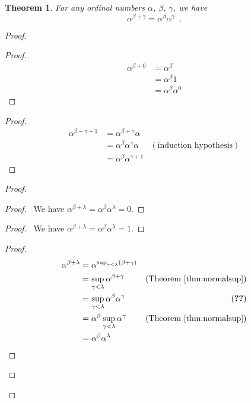 \documentclass{book}
\let\qed\relax
\newtheorem{thm}[ax]{Theorem}
\theoremstyle{definition}
\begin{document}
\begin{thm}
For any ordinal numbers $\alpha$, $\beta$, $\gamma$, we have
\[ \alpha^{\beta + \gamma} = \alpha^\beta \alpha^\gamma \enspace . \]
\end{thm}

\begin{proof}
\pf
{}
\begin{proof}
	\pf
	\begin{align*}
		\alpha^{\beta + 0} & = \alpha^\beta \\
		& = \alpha^\beta 1 \\
		& = \alpha^\beta \alpha^0
	\end{align*}
\end{proof}
\begin{proof}
	\pf
	\begin{align*}
		\alpha^{\beta + \gamma + 1} & = \alpha^{\beta + \gamma} \alpha \\
		& = \alpha^\beta \alpha^\gamma \alpha & (\text{induction hypothesis}) \\
		& = \alpha^\beta \alpha^{\gamma + 1}
	\end{align*}
\end{proof}
\begin{proof}
	\begin{proof}
		\pf\ We have $\alpha^{\beta + \lambda} = \alpha^\beta \alpha^\lambda = 0$.
	\end{proof}
	\begin{proof}
		\pf\ We have $\alpha^{\beta + \lambda} = \alpha^\beta \alpha^\lambda = 1$.
	\end{proof}
	\begin{proof}
		\pf
		\begin{align*}
			\alpha^{\beta + \lambda} & = \alpha^{\sup_{\gamma < \lambda} (\beta + \gamma)} \\
			& = \sup_{\gamma < \lambda} \alpha^{\beta + \gamma} & (\text{Theorem \ref{thm:normalsup}}) \\
			& = \sup_{\gamma < \lambda} \alpha^\beta \alpha^\gamma & (\text{\stepref{b}}) \\
			& = \alpha^\beta \sup_{\gamma < \lambda} \alpha^\gamma & (\text{Theorem \ref{thm:normalsup}}) \\
			& = \alpha^\beta \alpha^\lambda
		\end{align*}
	\end{proof}
\end{proof}
\qed
\end{proof}
\end{document}
